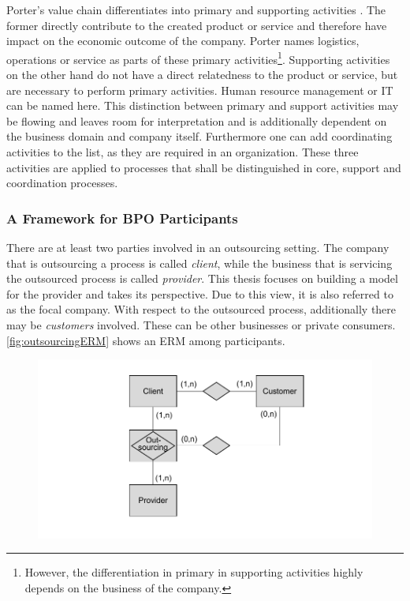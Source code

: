 	Porter's value chain differentiates into primary and supporting activities \citep{porter1985}. The former directly contribute to the created product or service and therefore have impact on the economic outcome of the company. Porter names logistics, operations or service as parts of these primary activities\footnote{However, the differentiation in primary in supporting activities highly depends on the business of the company.}. Supporting activities on the other hand do not have a direct relatedness to the product or service, but are necessary to perform primary activities. Human resource management or IT can be named here. This distinction between primary and support activities may be flowing and leaves room for interpretation and is additionally dependent on the business domain and company itself. Furthermore one can add coordinating activities to the list, as they are required in an organization. These three activities are applied to processes that shall be distinguished in core, support and coordination processes. 
	 
		\subsubsection{A Framework for BPO Participants}
		\label{sec:frameworkbpo}
	There are at least two parties involved in an outsourcing setting. The company that is outsourcing a process is called \textit{client}, while the business that is servicing the outsourced process is called \textit{provider}. This thesis focuses on building a model for the provider and takes its perspective. Due to this view, it is also referred to as the focal company. With respect to the outsourced process, additionally there may be \textit{customers} involved. These can be other businesses or private consumers.  \Fig \ref{fig:outsourcingERM} shows an \acrfull{ERM} \citep{Chen:1976:ERM} among participants.
			\begin{figure}[caption={Outsourcing ERM}, label={fig:outsourcingERM}]
		{	\includegraphics[width=.8\textwidth]{figures/outsourcingERM.pdf}}
	\end{figure}
	
